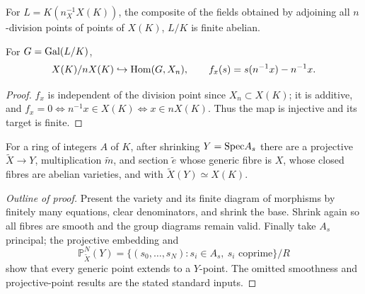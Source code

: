 \begin{lemma}\label{mumford-lem-fundamental-mordell-weil}
For $L=K(n_X^{-1}X(K))$, the composite of the fields obtained by adjoining
all $n$-division points of points of $X(K)$, $L/K$ is finite abelian.
\end{lemma}
\begin{proposition}\label{mumford-prop-kummer-deduction}
For $G={\rm Gal}(L/K)$,
\[
X(K)/nX(K)\hookrightarrow{\rm Hom}(G,X_n),\qquad
f_x(s)=s(n^{-1}x)-n^{-1}x.
\]
\end{proposition}
\begin{proof}
$f_x$ is independent of the division point since $X_n\subset X(K)$;
it is additive, and
$f_x=0\Longleftrightarrow n^{-1}x\in X(K)\Longleftrightarrow x\in nX(K)$.
Thus the map is injective and its target is finite.

\end{proof}

\begin{lemma}\label{mumford-lem-abelian-integral-model}
For a ring of integers $A$ of $K$, after shrinking $Y={\rm Spec}A_s$ there are
a projective $\widetilde X\to Y$, multiplication $\widetilde m$, and section
$\widetilde e$ whose generic fibre is $X$, whose closed fibres are abelian
varieties, and with $\widetilde X(Y)\simeq X(K)$.
\end{lemma}
\begin{proof}[Outline of proof]
Present the variety and its finite diagram of morphisms by finitely many
equations, clear denominators, and shrink the base. Shrink again so all fibres
are smooth and the group diagrams remain valid. Finally take $A_s$ principal;
the projective embedding and
\[
\mathbb P^N_{\widetilde X}(Y)=\{(s_0,\ldots,s_N):s_i\in A_s,\ s_i\text{ coprime}\}/R
\]
show that every generic point extends to a $Y$-point. The omitted smoothness
and projective-point results are the stated standard inputs.
\notready
\end{proof}

